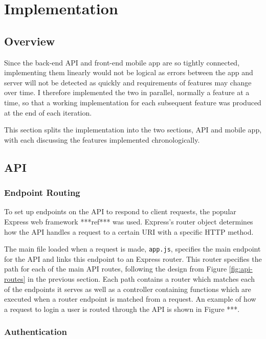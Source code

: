 \chapter{Implementation}


\section{Overview}

Since the back-end API and front-end mobile app are so tightly connected, implementing them linearly would not be logical as errors between the app and server will not be detected as quickly and requirements of features may change over time. I therefore implemented the two in parallel, normally a feature at a time, so that a working implementation for each subsequent feature was produced at the end of each iteration.

This section splits the implementation into the two sections, API and mobile app, with each discussing the features implemented chronologically.

\section{API}

\subsection{Endpoint Routing}

To set up endpoints on the API to respond to client requests, the popular Express web framework ***ref*** was used. Express's router object determines how the API handles a request to a certain URI with a specific HTTP method.

The main file loaded when a request is made, \texttt{app.js}, specifies the main endpoint for the API and links this endpoint to an Express router. This router specifies the path for each of the main API routes, following the design from Figure \ref{fig:api-routes} in the previous section. Each path contains a router which matches each of the endpoints it serves as well as a controller containing functions which are executed when a router endpoint is matched from a request. An example of how a request to login a user is routed through the API is shown in Figure ***.

\subsection{Authentication}

